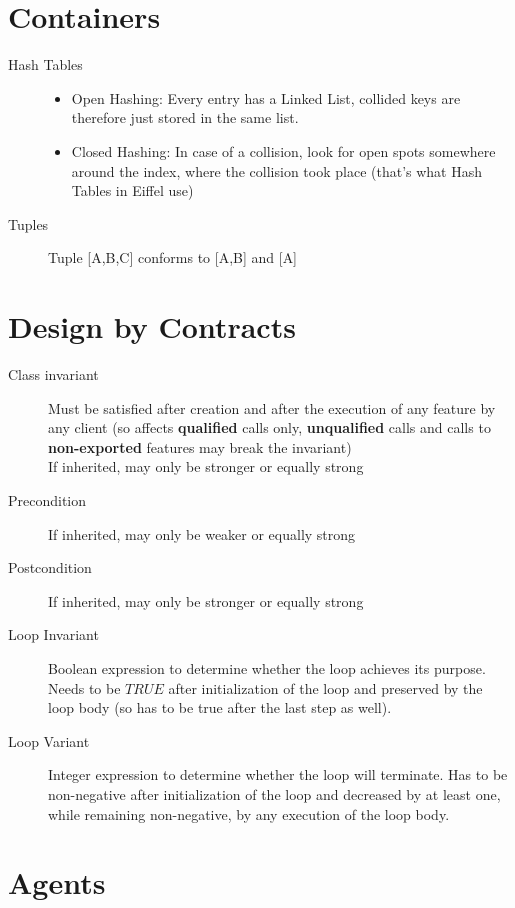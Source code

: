 \documentclass[11pt]{article}
\begin{document}
\section{Containers}

\begin{description}
	\item[Hash Tables]
	\begin{itemize}
		\item Open Hashing: Every entry has a Linked List, collided keys are therefore just stored in the same list.
		\item Closed Hashing: In case of a collision, look for open spots somewhere around the index, where the collision took place (that's what Hash Tables in Eiffel use)
	\end{itemize}
 	\item[Tuples] Tuple [A,B,C] conforms to [A,B] and [A]
\end{description}

\section{Design by Contracts}

\begin{description}
	\item[Class invariant] Must be satisfied after creation and after the execution of any feature by any client (so affects \textbf{qualified} calls only, \textbf{unqualified} calls and calls to \textbf{non-exported} features may break the invariant) \\
		If inherited, may only be stronger or equally strong
	\item[Precondition] If inherited, may only be weaker or equally strong
	\item[Postcondition] If inherited, may only be stronger or equally strong
	\item[Loop Invariant] Boolean expression to determine whether the loop achieves its purpose. Needs to be $TRUE$ after initialization of the loop and preserved by the loop body (so has to be true after the last step as well).
	\item[Loop Variant] Integer expression to determine whether the loop will terminate. Has to be non-negative after initialization of the loop and decreased by at least one, while remaining non-negative, by any execution of the loop body.
\end{description}

\section{Agents}
\end{document}
